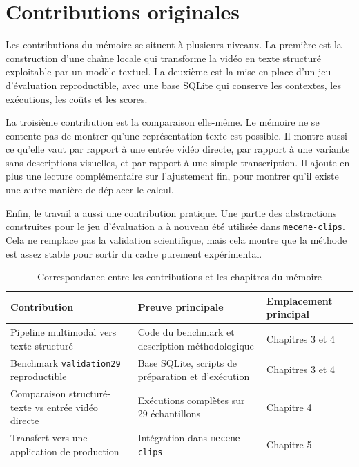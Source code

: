 \section{Contributions originales}

Les contributions du m\'emoire se situent \`a plusieurs niveaux. La premi\`ere est la construction d'une cha\^\i ne locale qui transforme la vid\'eo en texte structur\'e exploitable par un mod\`ele textuel. La deuxi\`eme est la mise en place d'un jeu d'\'evaluation reproductible, avec une base SQLite qui conserve les contextes, les ex\'ecutions, les co\^uts et les scores.

La troisi\`eme contribution est la comparaison elle-m\^eme. Le m\'emoire ne se contente pas de montrer qu'une repr\'esentation texte est possible. Il montre aussi ce qu'elle vaut par rapport \`a une entr\'ee vid\'eo directe, par rapport \`a une variante sans descriptions visuelles, et par rapport \`a une simple transcription. Il ajoute en plus une lecture compl\'ementaire sur l'ajustement fin, pour montrer qu'il existe une autre mani\`ere de d\'eplacer le calcul.

Enfin, le travail a aussi une contribution pratique. Une partie des abstractions construites pour le jeu d'\'evaluation a \`a nouveau \'et\'e utilis\'ee dans \texttt{mecene-clips}. Cela ne remplace pas la validation scientifique, mais cela montre que la m\'ethode est assez stable pour sortir du cadre purement exp\'erimental.

\begin{table}[ht]
\centering
\caption{Correspondance entre les contributions et les chapitres du m\'emoire}
\label{tab:contributions-map}
\begin{tabularx}{\textwidth}{>{\raggedright\arraybackslash}p{} >{\raggedright\arraybackslash}p{} >{\raggedright\arraybackslash}X}
\toprule
Contribution & Preuve principale & Emplacement principal \\
\midrule
Pipeline multimodal vers texte structur\'e & Code du benchmark et description m\'ethodologique & Chapitres 3 et 4 \\
Benchmark \texttt{validation29} reproductible & Base SQLite, scripts de pr\'eparation et d'ex\'ecution & Chapitres 3 et 4 \\
Comparaison structur\'e-texte vs entr\'ee vid\'eo directe & Ex\'ecutions compl\`etes sur 29 \'echantillons & Chapitre 4 \\
Transfert vers une application de production & Int\'egration dans \texttt{mecene-clips} & Chapitre 5 \\
\bottomrule
\end{tabularx}
\end{table}

